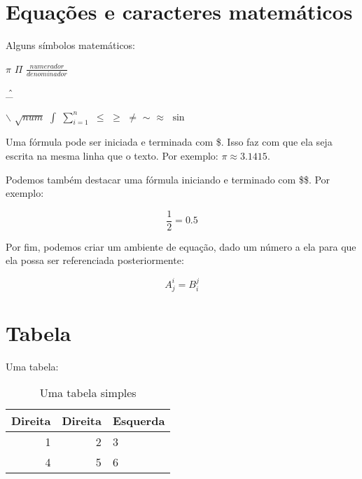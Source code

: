 \documentclass[12pt,a4paper]{report} %
\begin{document}
\section{Equações e caracteres matemáticos}

\mbox{}

Alguns símbolos matemáticos:

$\pi $ %
$\Pi $ %
$\frac{numerador}{denominador} $ %

\^ %
\_ %

$\backslash $ %
$\sqrt{num}$  %
$\int $ %
$\sum_{i = 1}^{n} $ %
$\leq $ %
$\geq $ %
$\neq $ %
$\sim $ %
$\approx $ %
$\sin $ %

Uma fórmula pode ser iniciada e terminada com \$. Isso faz com que ela seja escrita na mesma linha que o texto. Por exemplo: $\pi \approx 3.1415 $.

Podemos também destacar uma fórmula iniciando e terminado com \$\$. Por exemplo:

$$ \frac{1}{2} = 0.5 $$ %

Por fim, podemos criar um ambiente de equação, dado um número a ela para que ela possa ser referenciada posteriormente:

\begin{equation}\label{equacao}
A^{i}_{j} = B^{j}_{i} %
\end{equation} %


\section{Tabela}

\mbox{}

Uma tabela:


\begin{table}[ht] %
\begin{center} %
\begin{tiny} %
\begin{tabular}{rrl} %
  \hline %
Direita & Direita  &Esquerda \\
  \hline
1 & 2 & 3 \\
4 & 5 & 6 \\
   \hline
\end{tabular}
\end{tiny} %
\caption{Uma tabela simples} %
\label{tabelinha} %
\end{center} %
\end{table} %
\end{document}
